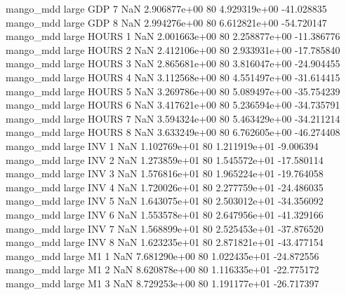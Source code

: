         mango_mdd      large      GDP                 7                  NaN 2.906877e+00 80   4.929319e+00         -41.028835
        mango_mdd      large      GDP                 8                  NaN 2.994276e+00 80   6.612821e+00         -54.720147
        mango_mdd      large    HOURS                 1                  NaN 2.001663e+00 80   2.258877e+00         -11.386776
        mango_mdd      large    HOURS                 2                  NaN 2.412106e+00 80   2.933931e+00         -17.785840
        mango_mdd      large    HOURS                 3                  NaN 2.865681e+00 80   3.816047e+00         -24.904455
        mango_mdd      large    HOURS                 4                  NaN 3.112568e+00 80   4.551497e+00         -31.614415
        mango_mdd      large    HOURS                 5                  NaN 3.269786e+00 80   5.089497e+00         -35.754239
        mango_mdd      large    HOURS                 6                  NaN 3.417621e+00 80   5.236594e+00         -34.735791
        mango_mdd      large    HOURS                 7                  NaN 3.594324e+00 80   5.463429e+00         -34.211214
        mango_mdd      large    HOURS                 8                  NaN 3.633249e+00 80   6.762605e+00         -46.274408
        mango_mdd      large      INV                 1                  NaN 1.102769e+01 80   1.211919e+01          -9.006394
        mango_mdd      large      INV                 2                  NaN 1.273859e+01 80   1.545572e+01         -17.580114
        mango_mdd      large      INV                 3                  NaN 1.576816e+01 80   1.965224e+01         -19.764058
        mango_mdd      large      INV                 4                  NaN 1.720026e+01 80   2.277759e+01         -24.486035
        mango_mdd      large      INV                 5                  NaN 1.643075e+01 80   2.503012e+01         -34.356092
        mango_mdd      large      INV                 6                  NaN 1.553578e+01 80   2.647956e+01         -41.329166
        mango_mdd      large      INV                 7                  NaN 1.568899e+01 80   2.525453e+01         -37.876520
        mango_mdd      large      INV                 8                  NaN 1.623235e+01 80   2.871821e+01         -43.477154
        mango_mdd      large       M1                 1                  NaN 7.681290e+00 80   1.022435e+01         -24.872556
        mango_mdd      large       M1                 2                  NaN 8.620878e+00 80   1.116335e+01         -22.775172
        mango_mdd      large       M1                 3                  NaN 8.729253e+00 80   1.191177e+01         -26.717397
